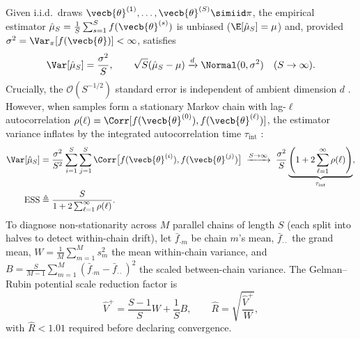 \documentclass[../../../../master.tex]{subfiles}
\begin{document}
\begin{coremath}
Given i.i.d.\ draws $\vecb{\theta}^{(1)}, \dots, \vecb{\theta}^{(S)} \simiid \pi$, the empirical estimator $\hat{\mu}_S = \frac{1}{S}\sum_{s=1}^S f(\vecb{\theta}^{(s)})$ is unbiased ($\E[\hat{\mu}_S] = \mu$) and, provided $\sigma^2 = \Var_{\pi}[f(\vecb{\theta})] < \infty$, satisfies
\begin{equation}
  \label{eq:mcmc:mc_variance}
  \Var[\hat{\mu}_S] = \frac{\sigma^2}{S},
  \qquad
  \sqrt{S}(\hat{\mu}_S - \mu) \xrightarrow{d} \Normal(0, \sigma^2) \quad (S \to \infty).
\end{equation}
Crucially, the $\mathcal{O}(S^{-1/2})$ standard error is independent of ambient dimension $d$ . However, when samples form a stationary Markov chain with lag-$\ell$ autocorrelation $\rho(\ell) = \Corr[f(\vecb{\theta}^{(0)}), f(\vecb{\theta}^{(\ell)})]$, the estimator variance inflates by the integrated autocorrelation time $\tau_{\mathrm{int}}$ :
\begin{align}
  \label{eq:mcmc:ess_mcmc}
  \Var[\hat{\mu}_S]
  &= \frac{\sigma^2}{S^2} \sum_{i=1}^S \sum_{j=1}^S \Corr\bigl[f(\vecb{\theta}^{(i)}), f(\vecb{\theta}^{(j)})\bigr]
  \;\xrightarrow{S \to \infty}\; \frac{\sigma^2}{S} \underbrace{\left(1 + 2\sum_{\ell=1}^{\infty} \rho(\ell)\right)}_{\tau_{\mathrm{int}}}, \\
  \mathrm{ESS} &\triangleq \frac{S}{1 + 2\sum_{\ell=1}^{\infty} \rho(\ell)}.
\end{align}
To diagnose non-stationarity across $M$ parallel chains of length $S$ (each split into halves to detect within-chain drift), let $\bar{f}_{\cdot m}$ be chain $m$'s mean, $\bar{f}_{\cdot\cdot}$ the grand mean, $W = \frac{1}{M}\sum_{m=1}^M s_m^2$ the mean within-chain variance, and $B = \frac{S}{M-1}\sum_{m=1}^M (\bar{f}_{\cdot m} - \bar{f}_{\cdot\cdot})^2$ the scaled between-chain variance. The Gelman--Rubin potential scale reduction factor is 
\begin{equation}
  \label{eq:mcmc:rhat}
  \hat{V}^+ = \frac{S - 1}{S} W + \frac{1}{S} B,
  \qquad
  \hat{R} = \sqrt{\frac{\hat{V}^+}{W}},
\end{equation}
with $\hat{R} < 1.01$ required before declaring convergence.
\end{coremath}
\end{document}
